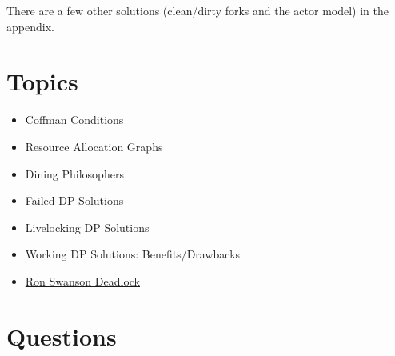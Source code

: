 There are a few other solutions (clean/dirty forks and the actor model) in the appendix.

\section{Topics}

\begin{itemize}
	\item Coffman Conditions
	\item Resource Allocation Graphs
	\item Dining Philosophers
	\item Failed DP Solutions
	\item Livelocking DP Solutions
	\item Working DP Solutions: Benefits/Drawbacks
	\item \href{http://adit.io/posts/2013-05-11-The-Dining-Philosophers-Problem-With-Ron-Swanson.html}{Ron Swanson Deadlock}
\end{itemize}

\section{Questions}

